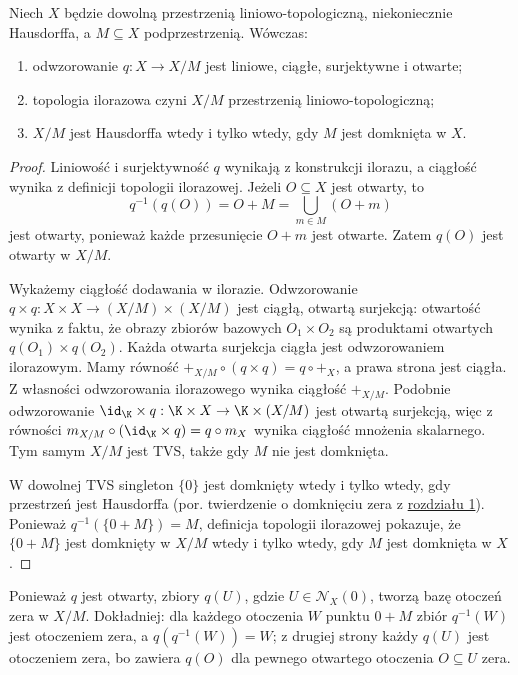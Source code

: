 \begin{twierdzenie}\label{thm:quotient-tvs}
Niech $X$ będzie dowolną przestrzenią liniowo-topologiczną,
niekoniecznie Hausdorffa, a $M\subseteq X$ podprzestrzenią.
Wówczas:
\begin{enumerate}[label=\textup{(\roman*)}]
\item odwzorowanie $q:X\to X/M$ jest liniowe, ciągłe,
      surjektywne i otwarte;
\item topologia ilorazowa czyni $X/M$ przestrzenią
      liniowo-topologiczną;
\item $X/M$ jest Hausdorffa wtedy i tylko wtedy,
      gdy $M$ jest domknięta w $X$.
\end{enumerate}
\end{twierdzenie}
\begin{proof}
Liniowość i surjektywność $q$ wynikają z konstrukcji
ilorazu, a ciągłość wynika z definicji topologii ilorazowej.
Jeżeli $O\subseteq X$ jest otwarty, to
\[
 q^{-1}(q(O))=O+M=\bigcup_{m\in M}(O+m)
\]
jest otwarty, ponieważ każde przesunięcie $O+m$
jest otwarte. Zatem $q(O)$ jest otwarty w $X/M$.

Wykażemy ciągłość dodawania w ilorazie. Odwzorowanie
$q\times q:X\times X\to(X/M)\times(X/M)$ jest ciągłą,
otwartą surjekcją: otwartość wynika z faktu, że obrazy
zbiorów bazowych $O_1\times O_2$ są produktami
otwartych $q(O_1)\times q(O_2)$. Każda otwarta surjekcja
ciągła jest odwzorowaniem ilorazowym. Mamy równość
$+_{X/M}\circ(q\times q)=q\circ+_X$, a prawa strona
jest ciągła. Z własności odwzorowania ilorazowego wynika
ciągłość $+_{X/M}$. Podobnie odwzorowanie
$\id_\K\times q:\K\times X\to\K\times(X/M)$ jest
otwartą surjekcją, więc z równości
$m_{X/M}\circ(\id_\K\times q)=q\circ m_X$
wynika ciągłość mnożenia skalarnego. Tym samym $X/M$
jest TVS, także gdy $M$ nie jest domknięta.

W dowolnej TVS singleton $\{0\}$ jest domknięty
wtedy i tylko wtedy, gdy przestrzeń jest Hausdorffa
(por. twierdzenie o domknięciu zera z \hyperref[sec:tvs]{rozdziału 1}).
Ponieważ $q^{-1}(\{0+M\})=M$, definicja topologii
ilorazowej pokazuje, że $\{0+M\}$ jest domknięty
w $X/M$ wtedy i tylko wtedy, gdy $M$ jest domknięta w $X$.
\end{proof}

\begin{uwaga}\label{rem:q-neighborhood}
Ponieważ $q$ jest otwarty, zbiory $q(U)$, gdzie
$U\in\mathcal N_X(0)$, tworzą bazę otoczeń zera
w $X/M$. Dokładniej: dla każdego otoczenia $W$
punktu $0+M$ zbiór $q^{-1}(W)$ jest otoczeniem zera,
a $q(q^{-1}(W))=W$; z drugiej strony każdy $q(U)$
jest otoczeniem zera, bo zawiera $q(O)$ dla pewnego
otwartego otoczenia $O\subseteq U$ zera.
\end{uwaga}

